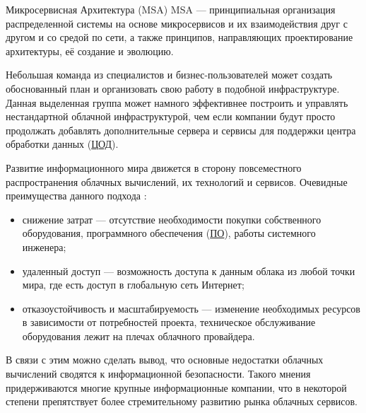 
Микросервисная Архитектура (MSA)
MSA — принципиальная организация распределенной системы на основе микросервисов и их взаимодействия друг с другом и со средой по сети, а также принципов, направляющих проектирование архитектуры, её создание и эволюцию.


Небольшая команда из специалистов и бизнес-пользователей может создать обоснованный план и организовать свою работу в подобной инфраструктуре.
Данная выделенная группа может намного эффективнее построить и управлять нестандартной облачной инфраструктурой, чем если компании будут просто продолжать добавлять дополнительные сервера и сервисы для поддержки центра обработки данных (\hyperlink{dc}{ЦОД}).

Развитие информационного мира движется в сторону повсеместного распространения облачных вычислений, их технологий и сервисов.
Очевидные преимущества данного подхода \cite{telecom-world}:
\begin{itemize}
  \item снижение затрат --- отсутствие необходимости покупки собственного оборудования, программного обеспечения (\hyperlink{soft}{ПО}), работы системного инженера;
  \item удаленный доступ --- возможность доступа к данным облака из любой точки мира, где есть доступ в глобальную сеть Интернет;
  \item отказоустойчивость и масштабируемость --- изменение необходимых ресурсов в зависимости от потребностей проекта, техническое обслуживание оборудования лежит на плечах облачного провайдера.
\end{itemize}

В связи с этим можно сделать вывод, что основные недостатки облачных вычислений сводятся к информационной безопасности.
Такого мнения придерживаются многие крупные информационные компании, что в некоторой степени препятствует более стремительному развитию рынка облачных сервисов.

\clearpage
